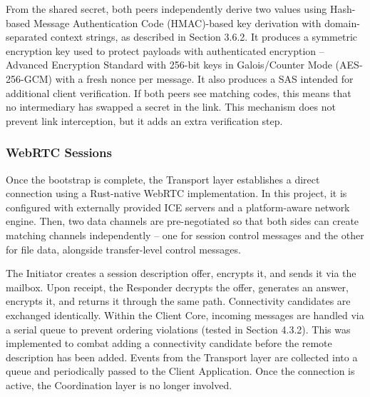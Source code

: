 \documentclass[12pt,a4paper]{article}
\begin{document}
From the shared secret, both peers independently derive two values using Hash-based Message Authentication Code (HMAC)-based key derivation with domain-separated context strings, as described in Section 3.6.2. It produces a symmetric encryption key used to protect payloads with authenticated encryption – Advanced Encryption Standard with 256-bit keys in Galois/Counter Mode (AES-256-GCM) with a fresh nonce per message. It also produces a SAS intended for additional client verification. If both peers see matching codes, this means that no intermediary has swapped a secret in the link. This mechanism does not prevent link interception, but it adds an extra verification step.

\subsubsection{WebRTC Sessions}

Once the bootstrap is complete, the Transport layer establishes a direct connection using a Rust-native WebRTC implementation. In this project, it is configured with externally provided ICE servers and a platform-aware network engine. Then, two data channels are pre-negotiated so that both sides can create matching channels independently – one for session control messages and the other for file data, alongside transfer-level control messages.

The Initiator creates a session description offer, encrypts it, and sends it via the mailbox. Upon receipt, the Responder decrypts the offer, generates an answer, encrypts it, and returns it through the same path. Connectivity candidates are exchanged identically. Within the Client Core, incoming messages are handled via a serial queue to prevent ordering violations (tested in Section 4.3.2). This was implemented to combat adding a connectivity candidate before the remote description has been added. Events from the Transport layer are collected into a queue and periodically passed to the Client Application. Once the connection is active, the Coordination layer is no longer involved.
\end{document}
